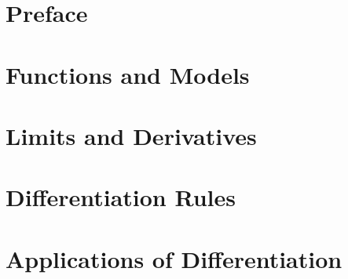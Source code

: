 \documentclass[oneside]{book}
\begin{document}
\pagebreak

\tableofcontents

\setcounter{tocdepth}{4}
\setcounter{secnumdepth}{4}

\pagebreak

\chapter*{Preface}



\mainmatter

\begin{savequote}

\end{savequote}
\chapter{Functions and Models} \label{chapter:funcmod}

    

\begin{savequote}

\end{savequote}
\chapter{Limits and Derivatives} \label{chapter:limder}

    

\begin{savequote}

\end{savequote}
\chapter{Differentiation Rules} \label{chapter:diffrules}

    

\begin{savequote}

\end{savequote}
\chapter{Applications of Differentiation} \label{chapter:appdiff}

    
\end{document}
